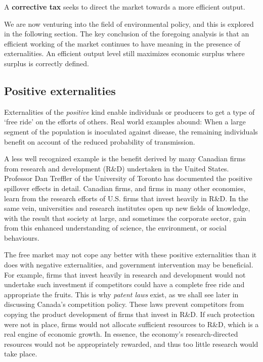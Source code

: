 \begin{DefBox}
A \textbf{corrective tax} seeks to direct the market towards a more efficient output.
\end{DefBox}

We are now venturing into the field of environmental policy, and this is explored in the following section. The key conclusion of the foregoing analysis is that an efficient working of the market continues to have meaning in the presence of externalities. An efficient output level still maximizes economic surplus where surplus is correctly defined.

\subsection*{Positive externalities}

Externalities of the \textit{positive} kind enable individuals or producers to get a type of `free ride' on the efforts of others. Real world examples abound: When a large segment of the population is inoculated against disease, the remaining individuals benefit on account of the reduced probability of transmission.

A less well recognized example is the benefit derived by many Canadian firms from research and development (R\&D) undertaken in the United States. Professor Dan Treffler of the University of Toronto has documented the positive spillover effects in detail. Canadian firms, and firms in many other economies, learn from the research efforts of U.S. firms that invest heavily in R\&D. In the same vein, universities and research institutes open up new fields of knowledge, with the result that society at large, and sometimes the corporate sector, gain from this enhanced understanding of science, the environment, or social behaviours.

The free market may not cope any better with these positive externalities than it does with negative externalities, and government intervention may be beneficial. For example, firms that invest heavily in research and development would not undertake such investment if competitors could have a complete free ride and appropriate the fruits. This is why \textit{patent laws} exist, as we shall see later in discussing Canada's competition policy. These laws prevent competitors from copying the product development of firms that invest in R\&D. If such protection were not in place, firms would not allocate sufficient resources to R\&D, which is a real engine of economic growth. In essence, the economy's research-directed resources would not be appropriately rewarded, and thus too little research would take place.

